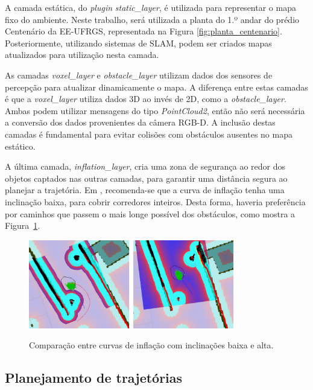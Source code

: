 \documentclass[repeatfields,xlists,xpacks,oneside,yearsonly]{ufrgscca}
\begin{document}
A camada estática, do \textit{plugin} \textit{static\_layer},
é utilizada para representar o mapa fixo do ambiente.
Neste trabalho, será utilizada a planta do 1.º andar do prédio Centenário da EE-UFRGS,
representada na Figura \ref{fig:planta_centenario}.
Posteriormente, utilizando sistemas de SLAM, podem ser criados mapas atualizados
para utilização nesta camada.

As camadas \textit{voxel\_layer} e \textit{obstacle\_layer} utilizam dados dos
sensores de percepção para atualizar dinamicamente o mapa.
A diferença entre estas camadas é que a \textit{voxel\_layer} utiliza dados 3D
ao invés de 2D, como a \textit{obstacle\_layer}. Ambas podem utilizar mensagens
do tipo \textit{PointCloud2}, então não será necessária a conversão dos
dados provenientes da câmera RGB-D.
A inclusão destas camadas é fundamental para evitar colisões com obstáculos
ausentes no mapa estático.

A última camada, \textit{inflation\_layer}, cria uma zona de segurança ao redor
dos objetos captados nas outras camadas, para garantir uma distância segura
ao planejar a trajetória.
Em \textcite{ros_tuning_guide}, recomenda-se que a curva de inflação tenha uma
inclinação baixa, para cobrir corredores inteiros.
Desta forma, haveria preferência por caminhos que passem o mais longe possível
dos obstáculos, como mostra a Figura~\ref{fig:inflation_layer}.

\begin{figure}[htbp]
    {
        \centering
        \caption{Comparação entre curvas de inflação com inclinações baixa e alta.}
        \label{fig:inflation_layer}
        \includegraphics[width=0.8\textwidth]{inflation_layer.png}\\
    }
    {}
\end{figure}

\subsection{Planejamento de trajetórias}
\end{document}
